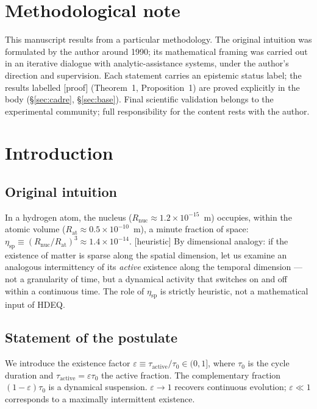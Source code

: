 \documentclass[11pt,a4paper]{article}
\newcommand{\statut}[1]{{\footnotesize\textsf{[#1]}}}
\theoremstyle{plain}
\theoremstyle{definition}
\theoremstyle{remark}
\begin{document}
\section{Methodological note}
This manuscript results from a particular methodology. The original intuition
was formulated by the author around 1990; its mathematical framing was carried
out in an iterative dialogue with analytic-assistance systems, under the
author's direction and supervision. Each statement carries an epistemic status
label; the results labelled \statut{proof} (Theorem~1, Proposition~1) are
proved explicitly in the body (\S\ref{sec:cadre}, \S\ref{sec:base}). Final
scientific validation belongs to the experimental community; full responsibility
for the content rests with the author.

\section{Introduction}
\subsection{Original intuition}
In a hydrogen atom, the nucleus ($R_{\mathrm{nuc}}\approx1.2\times10^{-15}$~m)
occupies, within the atomic volume ($R_{\mathrm{at}}\approx0.5\times10^{-10}$~m), a
minute fraction of space: $\eta_{\mathrm{sp}}\equiv(R_{\mathrm{nuc}}/R_{\mathrm{at}})^3
\approx1.4\times10^{-14}$. \statut{heuristic} By dimensional analogy: if the
existence of matter is sparse along the spatial dimension, let us examine an
analogous intermittency of its \emph{active} existence along the temporal
dimension --- not a granularity of time, but a dynamical activity that switches
on and off within a continuous time. The role of $\eta_{\mathrm{sp}}$ is strictly
heuristic, not a mathematical input of HDEQ.

\subsection{Statement of the postulate}
We introduce the existence factor $\varepsilon\equiv\tau_{\mathrm{active}}/\tau_0\in(0,1]$,
where $\tau_0$ is the cycle duration and $\tau_{\mathrm{active}}=\varepsilon\tau_0$ the
active fraction. The complementary fraction $(1-\varepsilon)\tau_0$ is a dynamical
suspension. $\varepsilon\to1$ recovers continuous evolution; $\varepsilon\ll1$
corresponds to a maximally intermittent existence.
\end{document}
